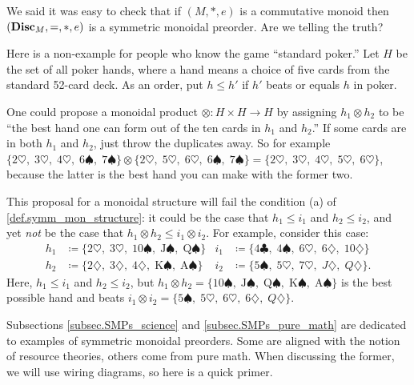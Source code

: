 \documentclass[7Sketches]{subfiles}
\begin{document}
\begin{exercise} %
\label{exc.disc_mon_preorder}
  We said it was easy to check that if $(M,*,e)$ is a commutative monoid then
  $(\mathbf{Disc}_M,=,*, e)$ is a symmetric monoidal preorder. Are we telling the truth?
\end{exercise}

\begin{example}%
\label{ex.nonexample_poker}%
Here is a non-example for people who know the game ``standard poker.'' Let $H$
be the set of all poker hands, where a hand means a choice of five cards from
the standard 52-card deck. As an order, put $h\leq h'$ if $h'$ beats or
equals $h$ in poker.

One could propose a monoidal product $\otimes\colon H\times H\to H$ by assigning
$h_1\otimes h_2$ to be ``the best hand one can form out of the ten cards in
$h_1$ and $h_2$.'' If some cards are in both $h_1$ and $h_2$, just throw the
duplicates away. So for example $\{2\heartsuit,\; 3\heartsuit,\; 4\heartsuit,\;
6\spadesuit,\; 7\spadesuit\}\otimes\{2\heartsuit,\; 5\heartsuit,\;
6\heartsuit,\; 6\spadesuit,\; 7\spadesuit\}=\{2\heartsuit,\; 3\heartsuit,\;
4\heartsuit,\; 5\heartsuit,\; 6\heartsuit\}$, because the latter is the best
hand you can make with the former two.

This proposal for a monoidal structure will fail the condition (a) of \cref{def.symm_mon_structure}: it could be the case that $h_1\leq i_1$ and $h_2\leq i_2$, and yet \emph{not} be the case that $h_1\otimes h_2\leq i_1\otimes i_2$. For example, consider this case:
\begin{align*}
  h_1&\coloneqq\{2\heartsuit,\; 3\heartsuit,\; 10\spadesuit,\; \mathrm{J}\spadesuit,\; \mathrm{Q}\spadesuit\}
  &
	i_1&\coloneqq\{4\clubsuit,\; 4\spadesuit,\; 6\heartsuit,\; 6\diamondsuit,\; 10\diamondsuit\}
	\\
	h_2&\coloneqq\{2\diamondsuit,\; 3\diamondsuit,\; 4\diamondsuit,\; \mathrm{K}\spadesuit,\; \mathrm{A}\spadesuit\}
	&	
	i_2&\coloneqq\{5\spadesuit,\; 5\heartsuit,\; 7\heartsuit,\; J\diamondsuit,\; Q\diamondsuit\}.
\end{align*}
Here, $h_1\leq i_1$ and $h_2\leq i_2$, but $h_1\otimes h_2=\{10\spadesuit,\; \mathrm{J}\spadesuit,\; \mathrm{Q}\spadesuit,\; \mathrm{K}\spadesuit,\; \mathrm{A}\spadesuit\}$ is the best possible hand and beats $i_1\otimes i_2=\{5\spadesuit,\; 5\heartsuit,\; 6\heartsuit,\; 6\diamondsuit,\; Q\diamondsuit\}$.
\end{example}

Subsections \ref{subsec.SMPs_science} and \ref{subsec.SMPs_pure_math}
are dedicated to examples of symmetric monoidal preorders. Some are aligned
with the notion of resource theories, others come from pure math. When
discussing the former, we will use wiring diagrams, so here is a quick primer.
\end{document}
